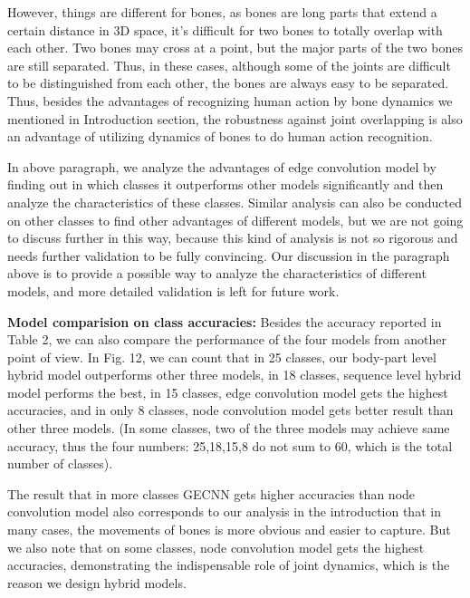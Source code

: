 \documentclass[a4paper,11pt]{article}
\begin{document}
 However, things are different for bones, as bones are long parts that extend a certain distance in 3D space, it's difficult for two bones to totally overlap with each other. Two bones may cross at a point, but the major parts of the two bones are still separated. Thus, in these cases, although some of the joints are difficult to be distinguished from each other, the bones are always easy to be separated. Thus, besides the advantages of recognizing human action by bone dynamics we mentioned in Introduction section, the robustness against joint overlapping is also an advantage of utilizing dynamics of bones to do human action recognition.

In above paragraph, we analyze the advantages of edge convolution model by finding out in which classes it outperforms other models significantly and then analyze the characteristics of these classes. Similar analysis can also be conducted on other classes to find other advantages of different models, but we are not going to discuss further in this way, because this kind of analysis is not so rigorous and needs further validation to be fully convincing. Our discussion in the paragraph above is to provide a possible way to analyze the characteristics of different models, and more detailed validation is left for future work.

{\bf Model comparision on class accuracies:}
Besides the accuracy reported in Table 2, we can also compare the performance of the four models from another point of view. In Fig. 12, we can count that in 25 classes, our body-part level hybrid model outperforms other three models, in 18 classes, sequence level hybrid model performs the best, in 15 classes, edge convolution model gets the highest accuracies, and in only 8 classes, node convolution model gets better result than other three models. (In some classes, two of the three models may achieve same accuracy, thus the four numbers: 25,18,15,8 do not sum to 60, which is the total number of classes).

The result that in more classes GECNN gets higher accuracies than node convolution model also corresponds to our analysis in the introduction that in many cases, the movements of bones is more obvious and easier to capture.
But we also note that on some classes, node convolution model gets the highest accuracies, demonstrating the indispensable role of joint dynamics, which is the reason we design hybrid models.
\end{document}
